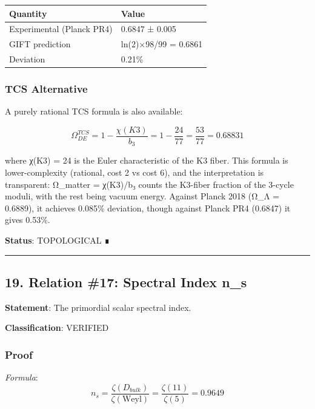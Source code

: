 \documentclass[11pt,a4paper]{article}
\begin{document}
{\def\LTcaptype{none} %
\begin{longtable}[]{@{}ll@{}}
\toprule\noalign{}
Quantity & Value \\
\midrule\noalign{}
\endhead
\bottomrule\noalign{}
\endlastfoot
Experimental (Planck PR4) & 0.6847 ± 0.005 \\
GIFT prediction & ln(2)×98/99 = 0.6861 \\
Deviation & 0.21\% \\
\end{longtable}
}

\subsubsection{TCS Alternative}\label{tcs-alternative-1}

A purely rational TCS formula is also available:

\[\Omega_{DE}^{TCS} = 1 - \frac{\chi(K3)}{b_3} = 1 - \frac{24}{77} = \frac{53}{77} = 0.68831\]

where χ(K3) = 24 is the Euler characteristic of the K3 fiber. This formula is lower-complexity (rational, cost 2 vs cost 6), and the interpretation is transparent: Ω\_matter = χ(K3)/b₃ counts the K3-fiber fraction of the 3-cycle moduli, with the rest being vacuum energy. Against Planck 2018 (Ω\_Λ = 0.6889), it achieves 0.085\% deviation, though against Planck PR4 (0.6847) it gives 0.53\%.

\textbf{Status}: TOPOLOGICAL ∎

\begin{center}\rule{0.5\linewidth}{0.5pt}\end{center}

\subsection{19. Relation \#17: Spectral Index n\_s}\label{relation-17-spectral-index-n_s}

\textbf{Statement}: The primordial scalar spectral index.

\textbf{Classification}: VERIFIED

\subsubsection{Proof}\label{proof-21}

\emph{Formula}:
\[n_s = \frac{\zeta(D_{bulk})}{\zeta(\text{Weyl})} = \frac{\zeta(11)}{\zeta(5)} = 0.9649\]
\end{document}

